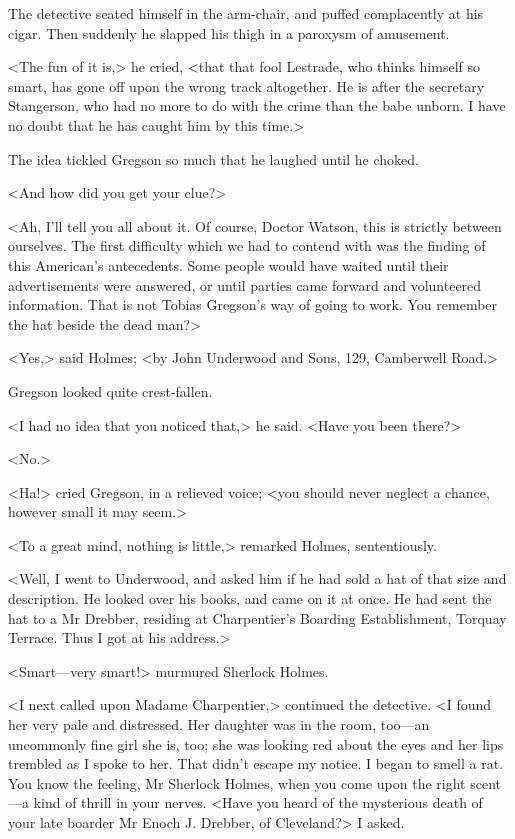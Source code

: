 The detective seated himself in the arm-chair, and puffed complacently at his cigar. Then suddenly he slapped his thigh in a paroxysm of amusement.

<The fun of it is,> he cried, <that that fool Lestrade, who thinks himself so smart, has gone off upon the wrong track altogether. He is after the secretary Stangerson, who had no more to do with the crime than the babe unborn. I have no doubt that he has caught him by this time.>

The idea tickled Gregson so much that he laughed until he choked.

<And how did you get your clue?>

<Ah, I'll tell you all about it. Of course, Doctor Watson, this is strictly between ourselves. The first difficulty which we had to contend with was the finding of this American's antecedents. Some people would have waited until their advertisements were answered, or until parties came forward and volunteered information. That is not Tobias Gregson's way of going to work. You remember the hat beside the dead man?>

<Yes,> said Holmes; <by John Underwood and Sons, 129, Camberwell Road.>

Gregson looked quite crest-fallen.

<I had no idea that you noticed that,> he said. <Have you been there?>

<No.>

<Ha!> cried Gregson, in a relieved voice; <you should never neglect a chance, however small it may seem.>

<To a great mind, nothing is little,> remarked Holmes, sententiously.

<Well, I went to Underwood, and asked him if he had sold a hat of that size and description. He looked over his books, and came on it at once. He had sent the hat to a Mr Drebber, residing at Charpentier's Boarding Establishment, Torquay Terrace. Thus I got at his address.>

<Smart—very smart!> murmured Sherlock Holmes.

<I next called upon Madame Charpentier,> continued the detective. <I found her very pale and distressed. Her daughter was in the room, too—an uncommonly fine girl she is, too; she was looking red about the eyes and her lips trembled as I spoke to her. That didn't escape my notice. I began to smell a rat. You know the feeling, Mr Sherlock Holmes, when you come upon the right scent—a kind of thrill in your nerves. <Have you heard of the mysterious death of your late boarder Mr Enoch J. Drebber, of Cleveland?> I asked.

